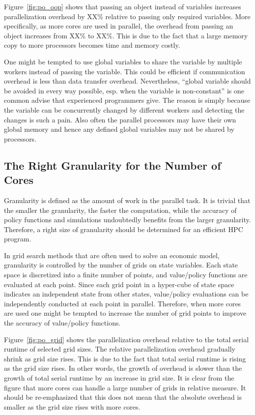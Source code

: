 \documentclass[12pt]{article}
\begin{document}
Figure~\ref{fig:po_oop} shows that passing an object instead of variables increases parallelization overhead by XX\% relative to passing only required variables. More specifically, as more cores are used in parallel, the overhead from passing an object increases from XX\% to XX\%. This is due to the fact that a large memory copy to more processors becomes time and memory costly.

One might be tempted to use global variables to share the variable by multiple workers instead of passing the variable. This could be efficient if communication overhead is less than data transfer overhead. Nevertheless, ``global variable should be avoided in every way possible, esp. when the variable is non-constant'' is one common advise that experienced programmers give. The reason is simply because the variable can be concurrently changed by different workers and detecting the changes is such a pain. Also often the parallel processors may have their own global memory and hence any defined global variables may not be shared by processors.



\subsection{The Right Granularity for the Number of Cores}
Granularity is defined as the amount of work in the parallel task. It is trivial that the smaller the granularity, the faster the computation, while the accuracy of policy functions and simulations undoubtedly benefits from the larger granularity. Therefore, a right size of granularity should be determined for an efficient HPC program.

In grid search methods that are often used to solve an economic model, granularity is controlled by the number of grids on state variables. Each state space is discretized into a finite number of points, and value/policy functions are evaluated at each point. Since each grid point in a hyper-cube of state space indicates an independent state from other states, value/policy evaluations can be independently conducted at each point in parallel. Therefore, when more cores are used one might be tempted to increase the number of grid points to improve the accuracy of value/policy functions.

Figure~\ref{fig:po_grid} shows the parallelization overhead relative to the total serial runtime of selected grid sizes. The relative parallelization overhead gradually shrink as grid size rises. This is due to the fact that total serial runtime is rising as the grid size rises. In other words, the growth of overhead is slower than the growth of total serial runtime by an increase in grid size. It is clear from the figure that more cores can handle a large number of grids in relative measure. It should be re-emphasized that this does not mean that the absolute overhead is smaller as the grid size rises with more cores.
\end{document}
